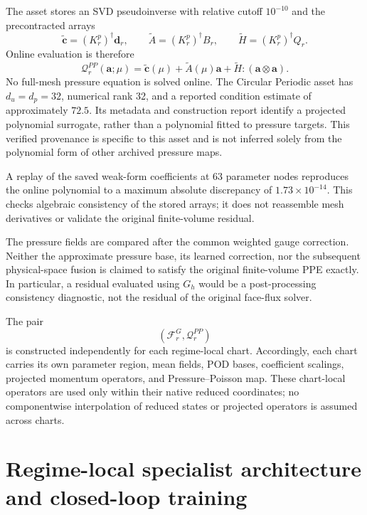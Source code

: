 \documentclass{article}
\begin{document}
The asset stores an SVD pseudoinverse with relative cutoff $10^{-10}$ and the precontracted arrays
\begin{equation}
 \widetilde{\bm c}=(K_r^p)^\dagger\bm d_r,\qquad
 \widetilde A=(K_r^p)^\dagger B_r,\qquad
 \widetilde H=(K_r^p)^\dagger Q_r.
\end{equation}
Online evaluation is therefore
\begin{equation}
 \mathcal Q_r^{PP}(\bm a;\mu)
 =\widetilde{\bm c}(\mu)+\widetilde A(\mu)\bm a+
   \widetilde H:(\bm a\otimes\bm a).
 \label{eq:app_pressure_poisson_map}
\end{equation}
No full-mesh pressure equation is solved online. The Circular Periodic asset has $d_u=d_p=32$, numerical rank 32, and a reported condition estimate of approximately $72.5$. Its metadata and construction report identify a projected polynomial surrogate, rather than a polynomial fitted to pressure targets. This verified provenance is specific to this asset and is not inferred solely from the polynomial form of other archived pressure maps.

A replay of the saved weak-form coefficients at 63 parameter nodes reproduces the online polynomial to a maximum absolute discrepancy of $1.73\times10^{-14}$. This checks algebraic consistency of the stored arrays; it does not reassemble mesh derivatives or validate the original finite-volume residual.

The pressure fields are compared after the common weighted gauge correction. Neither the approximate pressure base, its learned correction, nor the subsequent physical-space fusion is claimed to satisfy the original finite-volume PPE exactly. In particular, a residual evaluated using $G_h$ would be a post-processing consistency diagnostic, not the residual of the original face-flux solver.

The pair
\begin{equation}
    \left(
        \mathcal F_r^G,
        \mathcal Q_r^{PP}
    \right)
\end{equation}
is constructed independently for each regime-local chart.
Accordingly, each chart carries its own parameter region, mean fields,
POD bases, coefficient scalings, projected momentum operators, and
Pressure--Poisson map.
These chart-local operators are used only within their native reduced
coordinates; no componentwise interpolation of reduced states or projected
operators is assumed across charts.


\section{Regime-local specialist architecture and closed-loop training}
\label{app:specialists}
\end{document}
